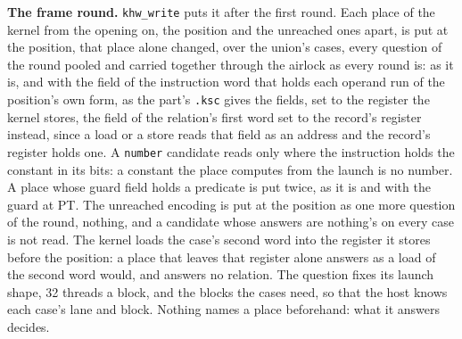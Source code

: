 \textbf{The frame round.} \texttt{khw\_\allowbreak{}write} puts it after the first round. Each place of the kernel from the opening on, the position and the unreached ones apart, is put at the position, that place alone changed, over the union's cases, every question of the round pooled and carried together through the airlock as every round is: as it is, and with the field of the instruction word that holds each operand run of the position's own form, as the part's \texttt{.\allowbreak{}ksc} gives the fields, set to the register the kernel stores, the field of the relation's first word set to the record's register instead, since a load or a store reads that field as an address and the record's register holds one. A \texttt{number} candidate reads only where the instruction holds the constant in its bits: a constant the place computes from the launch is no number. A place whose guard field holds a predicate is put twice, as it is and with the guard at PT. The unreached encoding is put at the position as one more question of the round, nothing, and a candidate whose answers are nothing's on every case is not read. The kernel loads the case's second word into the register it stores before the position: a place that leaves that register alone answers as a load of the second word would, and answers no relation. The question fixes its launch shape, 32 threads a block, and the blocks the cases need, so that the host knows each case's lane and block. Nothing names a place beforehand: what it answers decides.


